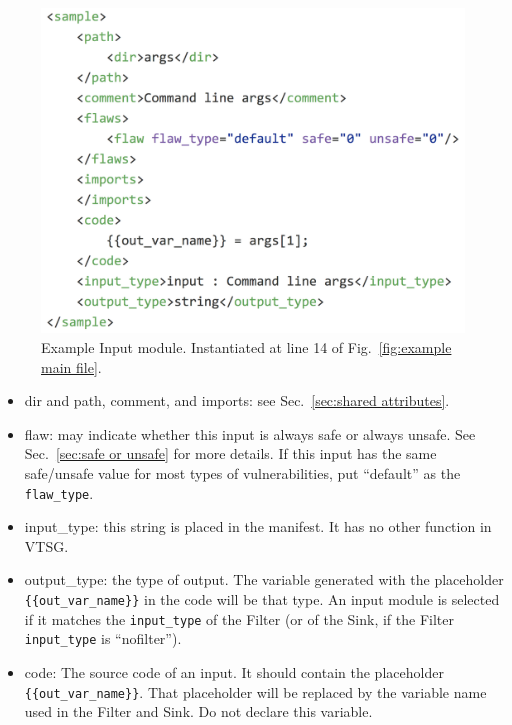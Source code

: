 \begin{figure}[htb]
  \includegraphics{fig_Input_file.png}
  \caption{Example Input module.  Instantiated at line 14 of 
  Fig.~\ref{fig:example main file}.}
  \label{fig:example input file}
\end{figure}

\begin{itemize}
    \item dir and path, comment, and imports: see Sec.~\ref{sec:shared attributes}.

    \item flaw: may indicate whether this input is always safe or always unsafe.
      See Sec.~\ref{sec:safe or unsafe} for
      more details.  If this input has the same safe/unsafe value for most
      types of vulnerabilities, put ``default'' as the \verb|flaw_type|.

    \item input\_type: this string is placed in the manifest.  It has no other
      function in VTSG.

    \item output\_type: the type of output.  The variable generated with the
      placeholder \\ \verb|{{out_var_name}}| in the code will be that type.
      An input module is selected if it matches the \verb|input_type| of the Filter
      (or of the Sink, if the Filter \verb|input_type| is ``nofilter'').

    \item code: The source code of an input. It should contain the placeholder \\
      \verb|{{out_var_name}}|.  That placeholder will be replaced by the variable
      name used in the Filter and Sink.  Do not declare this variable.
\end{itemize}

